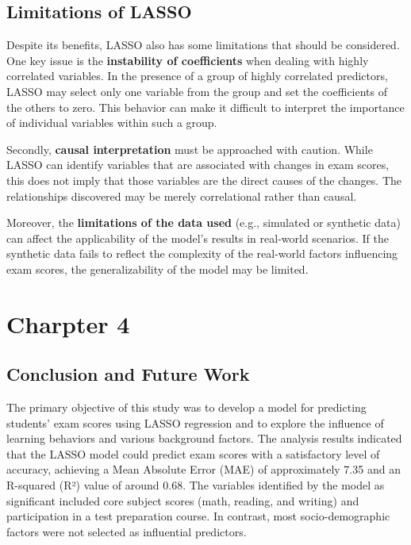 \documentclass[a4paper,12pt]{article}
\begin{document}
	\vspace{0.5cm}
	
	\subsection{Limitations of LASSO}
	Despite its benefits, LASSO also has some limitations that should be considered. One key issue is the \textbf{instability of coefficients} when dealing with highly correlated variables. In the presence of a group of highly correlated predictors, LASSO may select only one variable from the group and set the coefficients of the others to zero. This behavior can make it difficult to interpret the importance of individual variables within such a group.
	
	Secondly, \textbf{causal interpretation} must be approached with caution. While LASSO can identify variables that are associated with changes in exam scores, this does not imply that those variables are the direct causes of the changes. The relationships discovered may be merely correlational rather than causal.
	
	Moreover, the \textbf{limitations of the data used} (e.g., simulated or synthetic data) can affect the applicability of the model's results in real-world scenarios. If the synthetic data fails to reflect the complexity of the real-world factors influencing exam scores, the generalizability of the model may be limited.

\newpage
\section{Charpter 4}		
	\subsection{Conclusion and Future Work}

	The primary objective of this study was to develop a model for predicting students' exam scores using LASSO regression and to explore the influence of learning behaviors and various background factors. The analysis results indicated that the LASSO model could predict exam scores with a satisfactory level of accuracy, achieving a Mean Absolute Error (MAE) of approximately 7.35 and an R-squared (R²) value of around 0.68. The variables identified by the model as significant included core subject scores (math, reading, and writing) and participation in a test preparation course. In contrast, most socio-demographic factors were not selected as influential predictors.
\end{document}
